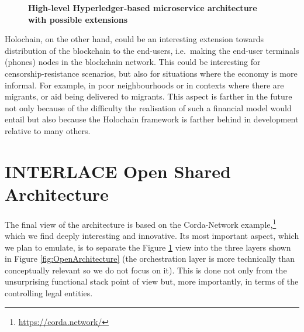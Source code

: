 \begin{figure}[h]
\centering
{}
\caption{\bf \small High-level Hyperledger-based microservice architecture with possible extensions}
\label{fig:HL_Architecture}
\end{figure}

Holochain, on the other hand, could be an interesting extension towards distribution of the blockchain to the end-users, i.e.\ making the end-user terminals (phones) nodes in the blockchain network. This could be interesting for censorship-resistance scenarios, but also for situations where the economy is more informal. For example, in poor neighbourhoods or in contexts where there are migrants, or aid being delivered to migrants. This aspect is farther in the future not only because of the difficulty the realisation of such a financial model would entail but also because the Holochain framework is farther behind in development relative to many others.

\section{INTERLACE Open Shared Architecture}
The final view of the architecture is based on the Corda-Network example,\footnote{\url{https://corda.network/}} which we find deeply interesting and innovative. Its most important aspect, which we plan to emulate, is to separate the Figure \ref{fig:HL_Architecture} view into the three layers shown in Figure \ref{fig:OpenArchitecture} (the orchestration layer is more technically than conceptually relevant so we do not focus on it). This is done not only from the unsurprising functional stack point of view but, more importantly, in terms of the controlling legal entities.


